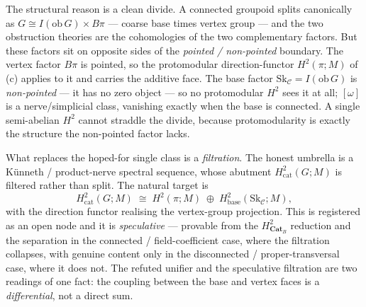 \documentclass[11pt]{report}
\theoremstyle{plain}
\theoremstyle{definition}
\theoremstyle{remark}
\newcommand{\Cat}{\mathbf{Cat}}
\newcommand{\Hcoh}{H^2}
\begin{document}
The structural reason is a clean divide. A connected groupoid splits canonically
as $G\cong I(\mathrm{ob}\,G)\times B\pi$ --- coarse base times vertex group ---
and the two obstruction theories are the cohomologies of the two complementary
factors. But these factors sit on opposite sides of the \emph{pointed /
non-pointed} boundary. The vertex factor $B\pi$ is pointed, so the protomodular
direction-functor $\Hcoh(\pi;M)$ of (c) applies to it and carries the additive
face. The base factor $\mathrm{Sk}_{\mathcal C}=I(\mathrm{ob}\,G)$ is
\emph{non-pointed} --- it has no zero object --- so no protomodular $\Hcoh$ sees
it at all; $[\omega]$ is a nerve/simplicial class, vanishing exactly when the base
is connected. A single semi-abelian $\Hcoh$ cannot straddle the divide, because
protomodularity is exactly the structure the non-pointed factor lacks.

What replaces the hoped-for single class is a \emph{filtration}. The honest
umbrella is a K\"unneth / product-nerve spectral sequence, whose abutment
$\Hcoh_{\mathrm{cat}}(G;M)$ is filtered rather than split. The natural target is
\begin{equation}\label{eq:cluster-decomp}
   \Hcoh_{\mathrm{cat}}(G;M)\;\cong\;\Hcoh(\pi;M)\;\oplus\;
   \Hcoh_{\mathrm{base}}(\mathrm{Sk}_{\mathcal C};M),
\end{equation}
with the direction functor realising the vertex-group projection. This is
registered as an open node and it is \emph{speculative} --- provable from the
$\Hcoh_{\Cat_B}$ reduction and the separation in the connected / field-coefficient
case, where the filtration collapses, with genuine content only in the
disconnected / proper-transversal case, where it does not. The refuted unifier
and the speculative filtration are two readings of one fact: the coupling between
the base and vertex faces is a \emph{differential}, not a direct sum.
\end{document}
